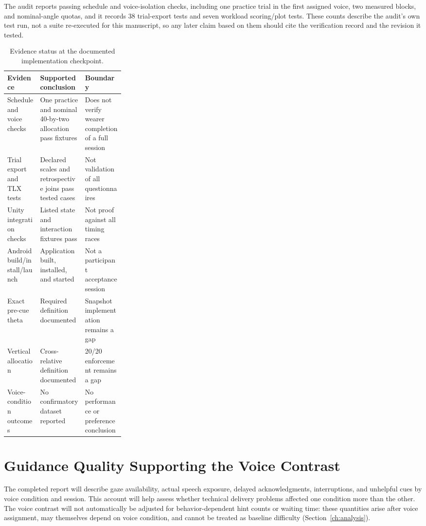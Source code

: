 The audit reports passing schedule and voice-isolation checks, including one practice trial in the first assigned voice, two measured blocks, and nominal-angle quotas, and it records 38 trial-export tests and seven workload scoring/plot tests. These counts describe the audit's own test run, not a suite re-executed for this manuscript, so any later claim based on them should cite the verification record and the revision it tested.

\begin{table}[htbp]
\centering\caption{Evidence status at the documented implementation checkpoint.}
\small{}
\begin{tabularx}{\linewidth}{@{}p{0.28\linewidth}XX@{}}\toprule
Evidence & Supported conclusion & Boundary \\\midrule
Schedule and voice checks & One practice and nominal 40-by-two allocation pass fixtures & Does not verify wearer completion of a full session \\
Trial export and TLX tests & Declared scales and retrospective joins pass tested cases & Not validation of all questionnaires \\
Unity integration checks & Listed state and interaction fixtures pass & Not proof against all timing races \\
Android build/install/launch & Application built, installed, and started & Not a participant acceptance session \\
Exact pre-cue theta & Required definition documented & Snapshot implementation remains a gap \\
Vertical allocation & Cross-relative definition documented & 20/20 enforcement remains a gap \\
Voice-condition outcomes & No confirmatory dataset reported & No performance or preference conclusion \\\bottomrule
\end{tabularx}
\end{table}


\section{Guidance Quality Supporting the Voice Contrast}
The completed report will describe gaze availability, actual speech exposure, delayed acknowledgments, interruptions, and unhelpful cues by voice condition and session. This account will help assess whether technical delivery problems affected one condition more than the other. The voice contrast will not automatically be adjusted for behavior-dependent hint counts or waiting time: these quantities arise after voice assignment, may themselves depend on voice condition, and cannot be treated as baseline difficulty (Section~\ref{ch:analysis}).

